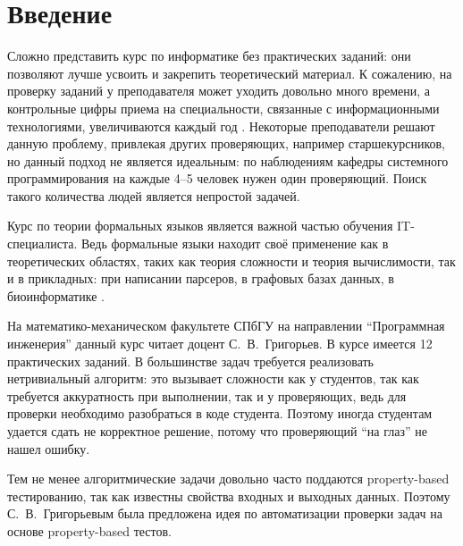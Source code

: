 
\section*{Введение}
\thispagestyle{withCompileDate}

Сложно представить курс по информатике без практических заданий: они позволяют лучше усвоить и закрепить теоретический материал.
К сожалению, на проверку заданий у преподавателя может уходить довольно много времени, а контрольные цифры приема на специальности, связанные с информационными технологиями, увеличиваются каждый год .
Некоторые преподаватели решают данную проблему, привлекая других проверяющих, например старшекурсников, но данный подход не является идеальным: по наблюдениям кафедры системного программирования  на каждые 4--5 человек нужен один проверяющий.
Поиск такого количества людей является непростой задачей.

Курс по теории формальных языков является важной частью обучения IT-специалиста.
Ведь формальные языки находит своё применение как в теоретических областях, таких как теория сложности и теория вычислимости, так и в прикладных: при написании парсеров, в графовых базах данных, в биоинформатике .

На математико-механическом факультете СПбГУ на направлении \enquote{Программная инженерия} данный курс читает доцент С.~В.~Григорьев.
В курсе имеется 12 практических заданий.
В большинстве задач требуется реализовать нетривиальный алгоритм: это вызывает сложности как у студентов, так как требуется аккуратность при выполнении, так и у проверяющих, ведь для проверки необходимо разобраться в коде студента.
Поэтому иногда студентам удается сдать не корректное решение, потому что проверяющий \enquote{на глаз} не нашел ошибку.

Тем не менее алгоритмические задачи довольно часто поддаются property-based тестированию, так как известны свойства входных и выходных данных.
Поэтому С.~В.~Григорьевым была предложена идея по автоматизации проверки задач на основе property-based тестов.

